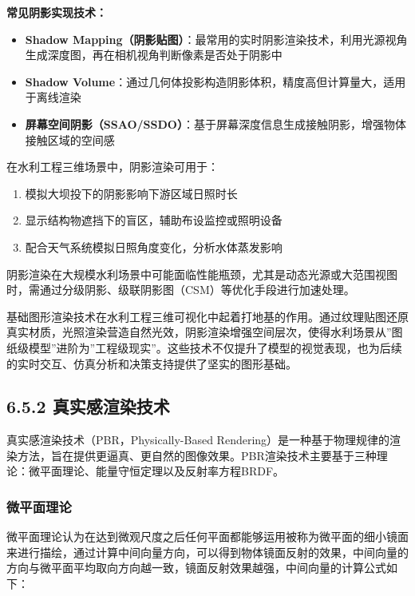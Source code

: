 \textbf{常见阴影实现技术：}

\begin{itemize}
\tightlist
\item
  \textbf{Shadow
  Mapping（阴影贴图）}：最常用的实时阴影渲染技术，利用光源视角生成深度图，再在相机视角判断像素是否处于阴影中
\item
  \textbf{Shadow
  Volume}：通过几何体投影构造阴影体积，精度高但计算量大，适用于离线渲染
\item
  \textbf{屏幕空间阴影（SSAO/SSDO）}：基于屏幕深度信息生成接触阴影，增强物体接触区域的空间感
\end{itemize}

在水利工程三维场景中，阴影渲染可用于：

\begin{enumerate}
\def\labelenumi{\arabic{enumi}.}
\tightlist
\item
  模拟大坝投下的阴影影响下游区域日照时长
\item
  显示结构物遮挡下的盲区，辅助布设监控或照明设备
\item
  配合天气系统模拟日照角度变化，分析水体蒸发影响
\end{enumerate}

阴影渲染在大规模水利场景中可能面临性能瓶颈，尤其是动态光源或大范围视图时，需通过分级阴影、级联阴影图（CSM）等优化手段进行加速处理。

基础图形渲染技术在水利工程三维可视化中起着打地基的作用。通过纹理贴图还原真实材质，光照渲染营造自然光效，阴影渲染增强空间层次，使得水利场景从''图纸级模型''进阶为''工程级现实''。这些技术不仅提升了模型的视觉表现，也为后续的实时交互、仿真分析和决策支持提供了坚实的图形基础。

\subsection{6.5.2
真实感渲染技术}\label{ux771fux5b9eux611fux6e32ux67d3ux6280ux672f}

真实感渲染技术（PBR，Physically-Based
Rendering）是一种基于物理规律的渲染方法，旨在提供更逼真、更自然的图像效果。PBR渲染技术主要基于三种理论：微平面理论、能量守恒定理以及反射率方程BRDF。

\subsubsection{微平面理论}\label{ux5faeux5e73ux9762ux7406ux8bba}

微平面理论认为在达到微观尺度之后任何平面都能够运用被称为微平面的细小镜面来进行描绘，通过计算中间向量方向，可以得到物体镜面反射的效果，中间向量的方向与微平面平均取向方向越一致，镜面反射效果越强，中间向量的计算公式如下：

